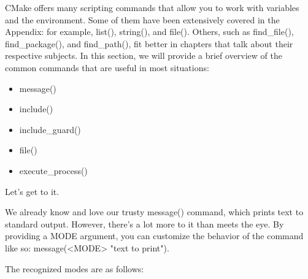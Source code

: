 
CMake offers many scripting commands that allow you to work with variables and the environment. Some of them have been extensively covered in the Appendix: for example, list(), string(), and file(). Others, such as find\_file(), find\_package(), and find\_path(), fit better in chapters that talk about their respective subjects. In this section, we will provide a brief overview of the common commands that are useful in most situations:

\begin{itemize}
\item
message()

\item
include()

\item
include\_guard()

\item
file()

\item
execute\_process()
\end{itemize}

Let’s get to it.


We already know and love our trusty message() command, which prints text to standard output. However, there’s a lot more to it than meets the eye. By providing a MODE argument, you can customize the behavior of the command like so: message(<MODE> "text to print").

The recognized modes are as follows:

